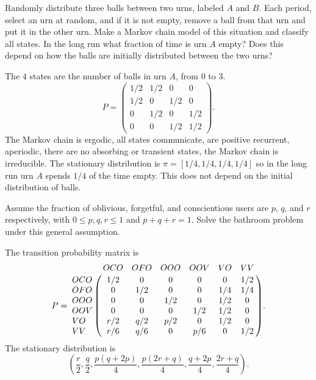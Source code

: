 \documentclass[12pt]{article}
\begin{document}
\begin{exercise}
    Randomly distribute three balls between two urns, labeled \( A \)
    and \( B \).  Each period, select an urn at random, and if it is not
    empty, remove a ball from that urn and put it in the other urn. Make
    a Markov chain model of this situation and classify all states. In
    the long run what fraction of time is urn \( A \) empty?  Does this
    depend on how the balls are initially distributed between the two
    urns?
\end{exercise}
\begin{solution}
    The \( 4 \) states are the number of balls in urn \( A \), from \( 0
    \) to \( 3 \).
    \[
        P =
        \begin{pmatrix}
            1/2 & 1/2 & 0 & 0 \\
            1/2 & 0 & 1/2 & 0 \\
            0 & 1/2 & 0 & 1/2 \\
            0 & 0 & 1/2 & 1/2
        \end{pmatrix}
        .
    \] The Markov chain is ergodic, all states communicate, are positive
    recurrent, aperiodic, there are no absorbing or transient states,
    the Markov chain is irreducible.  The stationary distribution is \(
    \pi = [1/4, 1/4, 1/4, 1/4] \) so in the long run urn \( A \) spends \(
    1/4 \) of the time empty.  This does not depend on the initial
    distribution of balls.
\end{solution}

\begin{exercise}
    Assume the fraction of oblivious, forgetful, and conscientious users
    are \( p \), \( q \), and \( r \) respectively, with \( 0 \le p,q,r
    \le 1 \) and \( p + q + r = 1 \).  Solve the bathroom problem under
    this general assumption.
\end{exercise}
\begin{solution}
    The transition probability matrix is
    \[
        P= \bordermatrix{ & OCO & OFO & OOO & OOV & VO & VV \cr
        OCO & 1/2 & 0 & 0 & 0 & 0 & 1/2 \cr
        OFO & 0 & 1/2 & 0 & 0 & 1/4 & 1/4 \cr
        OOO & 0 & 0 & 1/2 & 0 & 1/2 & 0 \cr
        OOV & 0 & 0 & 0 & 1/2 & 1/2 & 0 \cr
        VO & r/2 & q/2 & p/2 & 0 & 1/2 & 0 \cr
        VV & r/6 & q/6 & 0 & p/6 & 0 & 1/2 \cr
        }.
    \] The stationary distribution is
    \[
        \left( \frac{r}{2}, \frac{q}{2}, \frac{p(q + 2p)}{4}, \frac{p(2r
        + q)}{4}, \frac{q + 2p}{4}, \frac{2r + q}{4} \right).
    \]
\end{solution}
\end{document}

